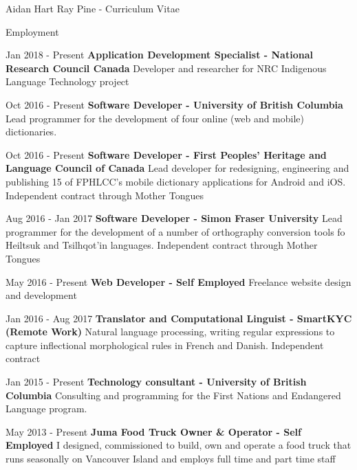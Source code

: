 \documentclass[12pt]{letter}
\begin{document}
\begin{cv}{ Aidan Hart Ray Pine  \space - \space   Curriculum Vitae}
         \begin{cvlist}{Employment}
                            \item[Jan 2018 -  Present ] \textbf{Application Development Specialist - National Research Council Canada}
                \newline Developer and researcher for NRC Indigenous Language Technology project
                            \item[Oct 2016 -  Present ] \textbf{Software Developer - University of British Columbia}
                \newline Lead programmer for the development of four online (web and mobile) dictionaries.
                            \item[Oct 2016 -  Present ] \textbf{Software Developer - First Peoples' Heritage and Language Council of Canada}
                \newline Lead developer for redesigning, engineering and publishing 15 of FPHLCC's mobile dictionary applications for Android and iOS. Independent contract through Mother Tongues
                            \item[Aug 2016 -  Jan 2017 ] \textbf{Software Developer - Simon Fraser University}
                \newline Lead programmer for the development of a number of orthography conversion tools fo Heiltsuk and Tsilhqot'in languages. Independent contract through Mother Tongues
                            \item[May 2016 -  Present ] \textbf{Web Developer - Self Employed}
                \newline Freelance website design and development
                            \item[Jan 2016 -  Aug 2017 ] \textbf{Translator and Computational Linguist - SmartKYC (Remote Work)}
                \newline Natural language processing, writing regular expressions to capture inflectional morphological rules in French and Danish. Independent contract
                            \item[Jan 2015 -  Present ] \textbf{Technology consultant - University of British Columbia}
                \newline Consulting and programming for the First Nations and Endangered Language program.
                            \item[May 2013 -  Present ] \textbf{Juma Food Truck Owner \& Operator - Self Employed}
                \newline I designed, commissioned to build, own and operate a food truck that runs seasonally on Vancouver Island and employs full time and part time staff

\end{cvlist}
\end{cv}
\end{document}

